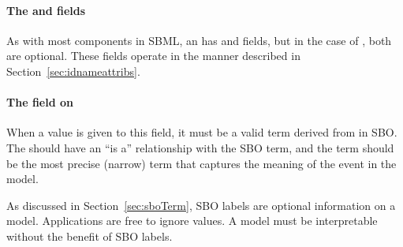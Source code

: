 \paragraph{The  and  fields}
\label{sec:event-id-name}

\begin{blockChanged}

As with most components in SBML, an \Event has  and
 fields, but in the case of \Event, both are optional.
These fields operate in the manner described in
Section~\ref{sec:idnameattribs}.

\end{blockChanged}


\paragraph{The  field on }
\label{sec:event-sboterm}

  When a value is given to this
field, it must be a valid term derived from \sboevent in SBO.  The
\Event should have an ``is a'' relationship with the SBO term, and
the term should be the most precise (narrow) term that captures
the meaning of the event in the model.

As discussed in Section~\ref{sec:sboTerm}, SBO labels are optional
information on a model.  Applications are free to ignore
 values.  A model must be interpretable without the
benefit of SBO labels.


